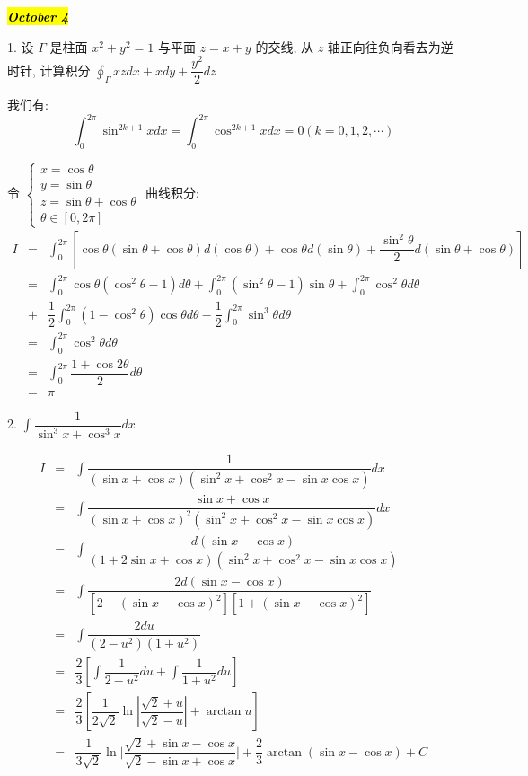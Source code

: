 \hl{\textbf{\textit{October 4}}}

1. 设 $\varGamma$ 是柱面 $x^{2}+y^{2}=1$ 与平面 $z=x+y$ 的交线,
从 $z$ 轴正向往负向看去为逆时针, 计算积分 $\displaystyle{\oint_{\varGamma}xzdx+xdy+\dfrac{y^2}{2}dz}$
\begin{solution}

	我们有:
	$$\int_{0}^{2\pi}\sin^{2k+1}xdx = \int_{0}^{2\pi}\cos^{2k+1}xdx = 0(k=0,1,2,\cdots)$$
	
	令 $\begin{cases}
		x = \cos \theta \\
		y = \sin \theta \\
		z = \sin \theta + \cos \theta \\
		\theta \in [0,2\pi]
	\end{cases}$  曲线积分:
	\begin{eqnarray*}
		  I & = & \int_{0}^{2\pi}\left[ \cos\theta(\sin\theta+\cos\theta)d(\cos\theta)
		   	      + \cos\theta d(\sin\theta) + \dfrac{\sin^{2}\theta}{2}d(\sin\theta+\cos\theta)\right]\\
			& = & \int_{0}^{2\pi}\cos\theta(\cos^{2}\theta-1)d\theta + \int_{0}^{2\pi}(\sin^{2}\theta-1)\sin\theta
				  + \int_{0}^{2\pi}\cos^{2}\theta d\theta \\
			& + & \dfrac{1}{2}\int_{0}^{2\pi}(1-\cos^{2}\theta)\cos\theta d\theta - \dfrac{1}{2}\int_{0}^{2\pi}\sin^{3}\theta d\theta\\
			& = & \int_{0}^{2\pi}\cos^{2}\theta d\theta\\
			& = & \int_{0}^{2\pi}\dfrac{1+\cos2\theta}{2}d\theta\\
			& = & \pi
	\end{eqnarray*}
\end{solution}

2. $\displaystyle{\int\dfrac{1}{\sin^{3} x+\cos^{3} x}dx}$
\begin{solution}  
	\begin{eqnarray*}
		I & = & \int \dfrac{1}{(\sin x+\cos x)(\sin^2 x+\cos^2 x-\sin x\cos x)}dx\\
		  & = & \int \dfrac{\sin x+\cos x}{(\sin x+\cos x)^{2}(\sin^2 x+\cos^2 x-\sin x\cos x)}dx\\
		  & = & \int \dfrac{d(\sin x-\cos x)}{(1+2\sin x+\cos x)(\sin^2 x+\cos^2 x-\sin x\cos x)}\\
		  & = & \int \dfrac{2d(\sin x-\cos x)}{\left[2-(\sin x-\cos x)^2\right]\left[1+(\sin x-\cos x)^2\right]}\\
		  & = & \int \dfrac{2du}{(2-u^2)(1+u^2)}\\
		  & = & \dfrac{2}{3}\left[\int\dfrac{1}{2-u^2}du+\int\dfrac{1}{1+u^2}du\right]\\
		  & = & \dfrac{2}{3}\left[\dfrac{1}{2\sqrt{2}}\ln|\dfrac{\sqrt{2}+u}{\sqrt{2}-u}|+\arctan u\right]\\
		  & = & \dfrac{1}{3\sqrt{2}}\ln\big|\dfrac{\sqrt{2}+\sin x-\cos x}{\sqrt{2}-\sin x+\cos x}\big|+\dfrac{2}{3}\arctan(\sin x-\cos x)+C
	\end{eqnarray*}
\end{solution}

